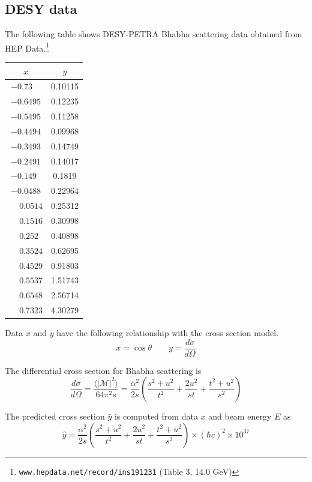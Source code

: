 \documentclass[12pt]{article}
\begin{document}
\subsection*{DESY data}
The following table shows DESY-PETRA Bhabha scattering data obtained from
HEP Data.\footnote{{\tt www.hepdata.net/record/ins191231} (Table 3, 14.0 GeV)}

\begin{center}
\begin{tabular}{|c|c|}
\hline
$x$ & $y$\\
\hline
$-0.73\phantom{00}$ & 0.10115\\
$-0.6495$ & 0.12235\\
$-0.5495$ & 0.11258\\
$-0.4494$ & 0.09968\\
$-0.3493$ & 0.14749\\
$-0.2491$ & 0.14017\\
$-0.149\phantom{0}$ & 0.1819\phantom{0}\\
$-0.0488$ & 0.22964\\
$\phantom{+}0.0514$ & 0.25312\\
$\phantom{+}0.1516$ & 0.30998\\
$\phantom{+}0.252\phantom{0}$ & 0.40898\\
$\phantom{+}0.3524$ & 0.62695\\
$\phantom{+}0.4529$ & 0.91803\\
$\phantom{+}0.5537$ & 1.51743\\
$\phantom{+}0.6548$ & 2.56714\\
$\phantom{+}0.7323$ & 4.30279\\
\hline
\end{tabular}
\end{center}

\noindent
Data $x$ and $y$ have the following relationship
with the cross section model.
\begin{equation*}
x=\cos\theta
\qquad
y=\frac{d\sigma}{d\Omega}
\end{equation*}

\noindent
The differential cross section for Bhabha scattering is
\begin{equation*}
\frac{d\sigma}{d\Omega}
=\frac{\langle|\mathcal{M}|^2\rangle}{64\pi^2s}
=\frac{\alpha^2}{2s}
\left(\frac{s^2+u^2}{t^2}+\frac{2u^2}{st}+\frac{t^2+u^2}{s^2}\right)
\end{equation*}

\noindent
The predicted cross section $\hat{y}$ is computed from data $x$ and beam energy $E$ as
\begin{equation*}
\hat{y}
=\frac{\alpha^2}{2s}
\left(\frac{s^2+u^2}{t^2}+\frac{2u^2}{st}+\frac{t^2+u^2}{s^2}\right)
\times(\hbar c)^2
\times10^{37}
\end{equation*}
\end{document}
